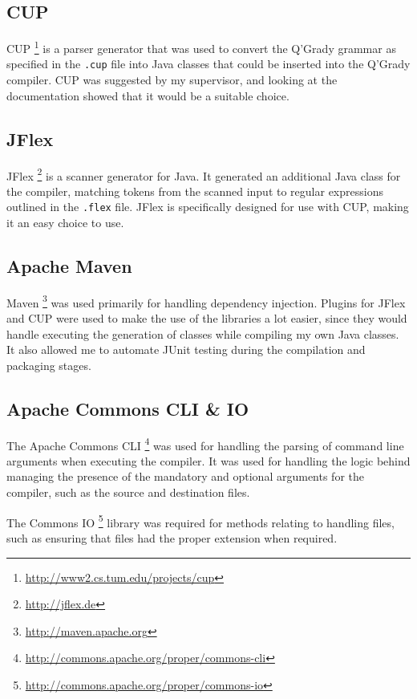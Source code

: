 \documentclass[report.tex]{subfiles}
\begin{document}
\subsection{CUP} %
\label{sub:cup}
CUP \footnote{\url{http://www2.cs.tum.edu/projects/cup}} is a parser generator
that was used to convert the Q'Grady grammar as specified in the \texttt{.cup}
file into Java classes that could be inserted into the Q'Grady compiler. CUP was
suggested by my supervisor, and looking at the documentation showed that it
would be a suitable choice.

\subsection{JFlex} %
\label{sub:jflex}
JFlex \footnote{\url{http://jflex.de}} is a scanner generator for Java. It generated an additional Java class for the compiler, matching tokens from the
scanned input to regular expressions outlined in the \texttt{.flex} file. JFlex
is specifically designed for use with CUP, making it an easy choice to use.

\subsection{Apache Maven} %
\label{sub:apache_maven}
Maven \footnote{\url{http://maven.apache.org}} was used primarily for handling
dependency injection. Plugins for JFlex and CUP were used to make the use of the
libraries a lot easier, since they would handle executing the generation of
classes while compiling my own Java classes. It also allowed me to automate
JUnit testing during the compilation and packaging stages.

\subsection{Apache Commons CLI \& IO} %
\label{sub:apache_commons_cli}
The Apache Commons CLI 
\footnote{\url{http://commons.apache.org/proper/commons-cli}} was used for handling the parsing of command line arguments when executing the compiler. It
was used for handling the logic behind managing the presence of the mandatory
and optional arguments for the compiler, such as the source and destination
files.

The Commons IO \footnote{\url{http://commons.apache.org/proper/commons-io}}
library was required for methods relating to handling files, such as ensuring
that files had the proper extension when required.
\end{document}
